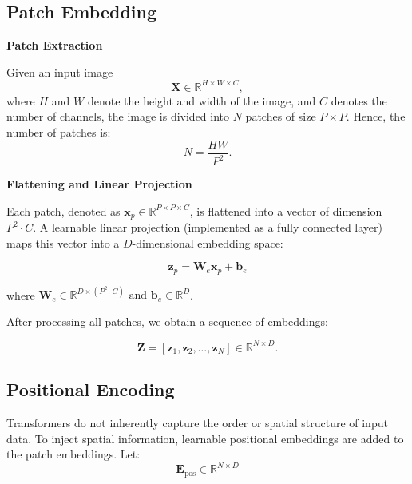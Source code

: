 \subsection{Patch Embedding}

\textbf{Patch Extraction}

Given an input image
\begin{equation}
  \mathbf{X} \in \mathbb{R}^{H \times W \times C},
\end{equation}
where \(H\) and \(W\) denote the height and width of the image, and \(C\) denotes the number of channels, the image is divided into \(N\) patches of size \(P \times P\). Hence, the number of patches is:
\begin{equation}
  N = \frac{HW}{P^2}.
\end{equation}

\textbf{Flattening and Linear Projection}

Each patch, denoted as \(\mathbf{x}_p \in \mathbb{R}^{P \times P \times C}\), is flattened into a vector of dimension \(P^2 \cdot C\). A learnable linear projection (implemented as a fully connected layer) maps this vector into a \(D\)-dimensional embedding space:

\begin{equation}
  \mathbf{z}_p = \mathbf{W}_e \mathbf{x}_p + \mathbf{b}_e
\end{equation}

where $\mathbf{W}_e \in \mathbb{R}^{D \times (P^2 \cdot C)} \text{ and } \mathbf{b}_e \in \mathbb{R}^{D}$.

After processing all patches, we obtain a sequence of embeddings:

\begin{equation}
  \mathbf{Z} = \left[\mathbf{z}_1, \mathbf{z}_2, \dots, \mathbf{z}_N\right] \in \mathbb{R}^{N \times D}.
\end{equation}

\subsection{Positional Encoding}

Transformers do not inherently capture the order or spatial structure of input data. To inject spatial information, learnable positional embeddings are added to the patch embeddings. Let:
\begin{equation}
  \mathbf{E}_{\text{pos}} \in \mathbb{R}^{N \times D}
\end{equation}

